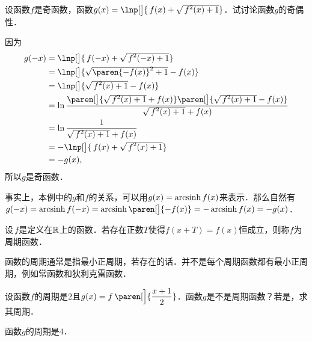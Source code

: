 \begin{example*}
  设函数\(f\)是奇函数，函数\(g(x) = \lnp[\big]{\,f(x) + \sqrt{\,\smash{f^2(x)+1}\rule[-.3ex]{0ex}{1.8ex}}}\)．试讨论函数\(g\)的奇偶性．

  \begin{remark}
    因为
    \[
      \begin{split}
        g(-x)
        &= \lnp[\big]{\,f(-x) + \sqrt{\,\smash{f^2(-x)+1}\rule[-.3ex]{0ex}{1.8ex}}} \\
        &= \lnp[\big]{\sqrt{\smash{\paren{-f(x)}^2+1}\rule[-.3ex]{0ex}{1.8ex}} - f(x)} \\
        &= \lnp[\big]{\sqrt{\,\smash{f^2(x)+1}\rule[-.3ex]{0ex}{1.8ex}} - f(x)} \\
        &= \ln{\frac{
          \paren[\big]{\sqrt{\,\smash{f^2(x)+1}\rule[-.3ex]{0ex}{1.8ex}} + f(x)}
          \paren[\big]{\sqrt{\,\smash{f^2(x)+1}\rule[-.3ex]{0ex}{1.8ex}} - f(x)}
          }{
          \sqrt{\,\smash{f^2(x)+1}\rule[-.3ex]{0ex}{1.8ex}} + f(x)}
          } \\
        &= \ln \frac1{\sqrt{\,\smash{f^2(x)+1}\rule[-.3ex]{0ex}{1.8ex}} + f(x)} \\
        &= -\lnp[\big]{\,f(x) + \sqrt{\,\smash{f^2(x)+1}\rule[-.3ex]{0ex}{1.8ex}}} \\
        &= -g(x),
      \end{split}
    \]
    所以\(g\)是奇函数．

    事实上，本例中的\(g\)和\(f\)的关系，可以用\(g(x) = \operatorname{arcsinh} f(x)\)来表示．那么自然有\(g(-x) = \arcsinh f(-x) = \arcsinh\paren[\big]{-f(x)} = - \arcsinh f(x) = -g(x)\)．
  \end{remark}
\end{example*}

\begin{definition*}
  设\(\,f\)是定义在\(\mathbb{R}\)上的函数．若存在正数\(T\)使得\(f(x+T) = f(x)\)恒成立，则称\(f\)为周期函数．

  \begin{remark}
    函数的周期通常是指最小正周期，若存在的话．并不是每个周期函数都有最小正周期，例如常函数和狄利克雷函数．
  \end{remark}
\end{definition*}

\begin{example*}
  设函数\(f\)的周期是\(2\)且\(g(x) = f\,\paren[\Big]{\dfrac{x+1}{2}}\)．函数\(g\)是不是周期函数？若是，求其周期．

  \begin{remark}
    函数\(g\)的周期是\(4\)．
  \end{remark}
\end{example*}

